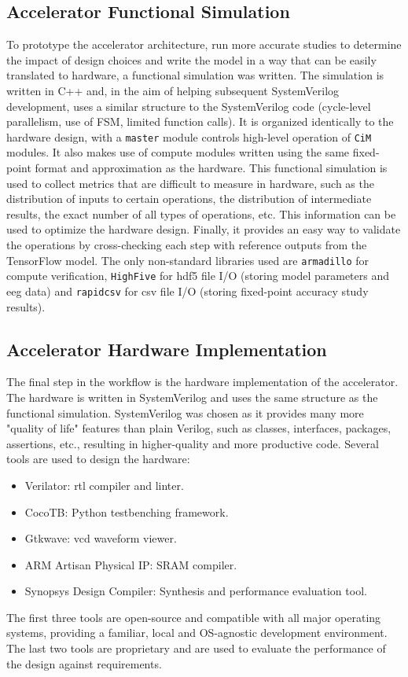 \subsection{Accelerator Functional Simulation}
To prototype the accelerator architecture, run more accurate studies to determine the impact of design choices and write the model in a way that can be easily translated to 
hardware, a functional simulation was written. The simulation is written in C++ and, in the aim of helping subsequent SystemVerilog development, uses a similar structure to
the SystemVerilog code (cycle-level parallelism, use of FSM, limited function calls). It is organized identically to the hardware design, with a \texttt{master} module controls
high-level operation of \texttt{CiM} modules. It also makes use of compute modules written using the same fixed-point format and approximation as the hardware. This functional 
simulation is used to collect metrics that are difficult to measure in hardware, such as the distribution of inputs to certain operations, the distribution of intermediate results,
the exact number of all types of operations, etc. This information can be used to optimize the hardware design. Finally, it provides an easy way to validate the operations by
cross-checking each step with reference outputs from the TensorFlow model. The only non-standard libraries used are \texttt{armadillo} for compute verification, \texttt{HighFive}
for \ac{hdf5} file I/O (storing model parameters and \ac{eeg} data) and \texttt{rapidcsv} for \ac{csv} file I/O (storing fixed-point accuracy study results).

\subsection{Accelerator Hardware Implementation}
The final step in the workflow is the hardware implementation of the accelerator. The hardware is written in SystemVerilog and uses the same structure as the functional simulation.
SystemVerilog was chosen as it provides many more "quality of life" features than plain Verilog, such as classes, interfaces, packages, assertions, etc., resulting in higher-quality
and more productive code. Several tools are used to design the hardware:
\begin{itemize}
    \item Verilator: \ac{rtl} compiler and linter.
    \item CocoTB: Python testbenching framework.
    \item Gtkwave: \ac{vcd} waveform viewer.
    \item ARM Artisan Physical IP: SRAM compiler.
    \item Synopsys Design Compiler: Synthesis and performance evaluation tool.
\end{itemize}
The first three tools are open-source and compatible with all major operating systems, providing a familiar, local and OS-agnostic development environment. The last two tools
are proprietary and are used to evaluate the performance of the design against requirements.
